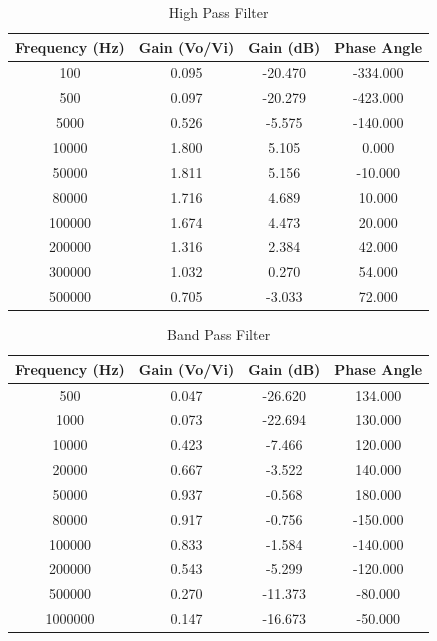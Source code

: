 \documentclass[CMPE]{KGCOEReport}
\begin{document}
\begin{table}[H]
    \centering
    \caption{High Pass Filter}
    \begin{tabular}{|c|c|c|c|}
        \hline
        Frequency (Hz) & Gain (Vo/Vi) & Gain (dB) & Phase Angle \\
        \hline
        100 & 0.095 & -20.470 & -334.000 \\
        500 & 0.097 & -20.279 & -423.000 \\
        5000 & 0.526 & -5.575 & -140.000 \\
        10000 & 1.800 & 5.105 & 0.000 \\
        50000 & 1.811 & 5.156 & -10.000 \\
        80000 & 1.716 & 4.689 & 10.000 \\
        100000 & 1.674 & 4.473 & 20.000 \\
        200000 & 1.316 & 2.384 & 42.000 \\
        300000 & 1.032 & 0.270 & 54.000 \\
        500000 & 0.705 & -3.033 & 72.000 \\
        \hline
    \end{tabular}
\end{table}

\begin{table}[H]
    \centering
    \caption{Band Pass Filter}
    \begin{tabular}{|c|c|c|c|}
        \hline
        Frequency (Hz) & Gain (Vo/Vi) & Gain (dB) & Phase Angle \\
        \hline
        500 & 0.047 & -26.620 & 134.000 \\
        1000 & 0.073 & -22.694 & 130.000 \\
        10000 & 0.423 & -7.466 & 120.000 \\
        20000 & 0.667 & -3.522 & 140.000 \\
        50000 & 0.937 & -0.568 & 180.000 \\
        80000 & 0.917 & -0.756 & -150.000 \\
        100000 & 0.833 & -1.584 & -140.000 \\
        200000 & 0.543 & -5.299 & -120.000 \\
        500000 & 0.270 & -11.373 & -80.000 \\
        1000000 & 0.147 & -16.673 & -50.000 \\
        \hline
    \end{tabular}
\end{table}
\end{document}
